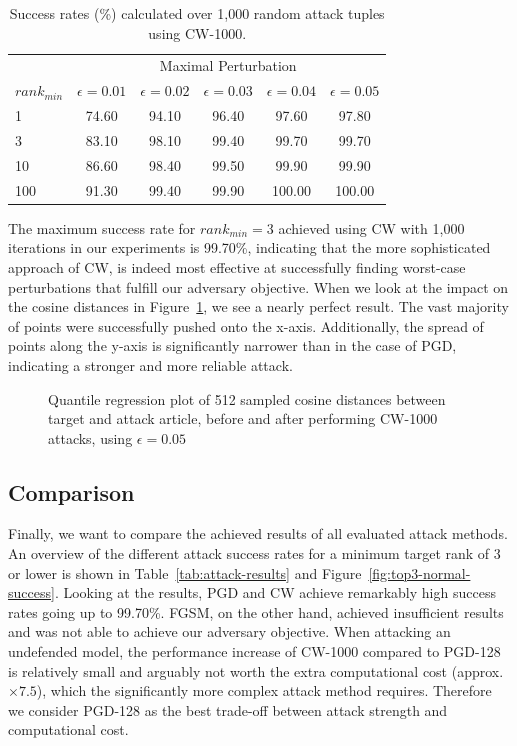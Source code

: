 \begin{table}[H]
	\centering
	\begin{tabular}{ lccccc } 
		\toprule		
		& \multicolumn{5}{c}{Maximal Perturbation} \\
		\cmidrule{2-6}
		$rank_{min}$ & $\epsilon = 0.01$ & $\epsilon = 0.02$ & $\epsilon = 0.03$  & $\epsilon = 0.04$ & $\epsilon = 0.05$  \\
		\midrule
		1 & 74.60 & 94.10 & 96.40 & 97.60 & 97.80 \\
		3 & 83.10 & 98.10 & 99.40 & 99.70 & 99.70 \\
		10 & 86.60 & 98.40 & 99.50 & 99.90 & 99.90 \\
		100 & 91.30 & 99.40 & 99.90 & 100.00 & 100.00 \\
		\bottomrule
	\end{tabular}
	\caption{Success rates (\%) calculated over 1,000 random attack tuples using \acs{CW}-1000.}
	\label{tab:cw-results}
\end{table}
The maximum success rate for $rank_{min}=3$ achieved using \ac{CW} with 1,000 iterations in our experiments is 99.70\%, indicating that the more sophisticated approach of \ac{CW}, is indeed most effective at successfully finding worst-case perturbations that fulfill our adversary objective. When we look at the impact on the cosine distances in Figure~\ref{fig:cw-quantile}, we see a nearly perfect result. The vast majority of  points were successfully pushed onto the x-axis. Additionally, the spread of points along the y-axis is significantly narrower than in the case of \ac{PGD}, indicating a stronger and more reliable attack.
\begin{figure}[H]
	\centering
	
	\caption{Quantile regression plot of 512 sampled cosine distances between target and attack article, before and after performing \acs{CW}-1000 attacks, using $\epsilon=0.05$}
	\label{fig:cw-quantile}
\end{figure}
\subsection{Comparison}
Finally, we want to compare the achieved results of all evaluated attack methods. An overview of the different attack success rates for a minimum target rank of 3 or lower is shown in Table~\ref{tab:attack-results} and Figure~\ref{fig:top3-normal-success}.  Looking at the results, \ac{PGD} and \ac{CW} achieve remarkably high success rates going up to 99.70\%. \ac{FGSM}, on the other hand, achieved insufficient results and was not able to achieve our adversary objective. When attacking an undefended model, the performance increase of \ac{CW}-1000 compared to \ac{PGD}-128 is relatively small and arguably not worth the extra computational cost (approx. $\times 7.5$), which the significantly more complex attack method requires. Therefore we consider \ac{PGD}-128 as the best trade-off between attack strength and computational cost.

